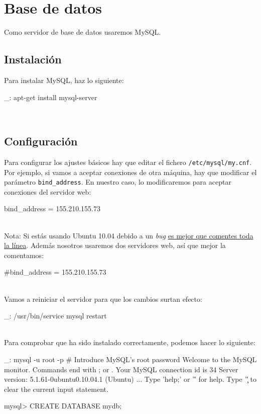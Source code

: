 \chapter{Base de datos}
\label{web:basedatos}

Como servidor de base de datos usaremos MySQL.


\section{Instalación}

Para instalar MySQL, haz lo siguiente:

\begin{bashcode}
_: apt-get install mysql-server
\end{bashcode}
\\


\section{Configuración}

Para configurar los ajustes básicos hay que editar el fichero \texttt{/etc/mysql/my.cnf}. Por ejemplo, si vamos a aceptar conexiones de otra máquina, hay que modificar el parámetro \texttt{bind\_address}. En nuestro caso, lo modificaremos para aceptar conexiones del servidor web:

\begin{bashcode}
bind_address = 155.210.155.73
\end{bashcode}
\\

Nota: Si estás usando Ubuntu 10.04 debido a un \emph{bug} \href{http://ubuntuforums.org/showthread.php?t=1479310}{es mejor que comentes toda la línea}. Además nosotros usaremos dos servidores web, así que mejor la comentamos:

\begin{bashcode}
#bind_address = 155.210.155.73
\end{bashcode}
\\

Vamos a reiniciar el servidor para que los cambios surtan efecto:

\begin{bashcode}
_: /usr/bin/service mysql restart
\end{bashcode}
\\

Para comprobar que ha sido instalado correctamente, podemos hacer lo siguiente:

\begin{bashcode}
_: mysql -u root -p     # Introduce MySQL's root password
Welcome to the MySQL monitor.  Commands end with ; or \g.
Your MySQL connection id is 34
Server version: 5.1.61-0ubuntu0.10.04.1 (Ubuntu)
...
Type 'help;' or '\h' for help. Type '\c' to clear the current input statement.

mysql> CREATE DATABASE mydb;
\end{bashcode}
\\


